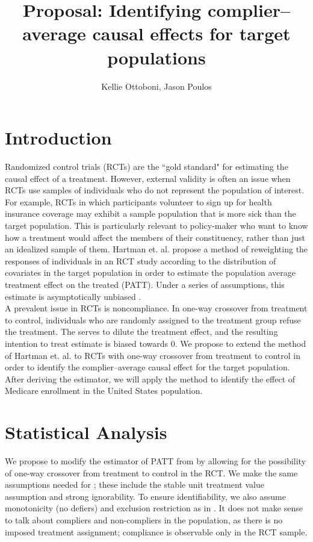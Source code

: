 \documentclass{article}
\title{Proposal: Identifying complier--average causal effects for target populations}
\author{Kellie Ottoboni, Jason Poulos}
\begin{document}
\maketitle

\section{Introduction}
Randomized control trials (RCTs) are the ``gold standard" for estimating the causal effect of a treatment.  However, external validity is often an issue when RCTs use samples of individuals who do not represent the population of interest.  For example, RCTs in which participants volunteer to sign up for health insurance coverage may exhibit a sample population that is more sick than the target population.  This is particularly relevant to policy-maker who want to know how a treatment would affect the members of their constituency, rather than just an idealized sample of them.  Hartman et. al. propose a method of reweighting the responses of individuals in an RCT study according to the distribution of covariates in the target population in order to estimate the population average treatment effect on the treated (PATT).  Under a series of assumptions, this estimate is asymptotically unbiased \cite{Hartman}. \\

A prevalent issue in RCTs is noncompliance.  In one-way crossover from treatment to control, individuals who are randomly assigned to the treatment group refuse the treatment.  The serves to dilute the treatment effect, and the resulting intention to treat estimate is biased towards $0$.  We propose to extend the method of Hartman et. al. to RCTs with one-way crossover from treatment to control in order to identify the complier--average causal effect for the target population.  After deriving the estimator, we will apply the method to identify the effect of Medicare enrollment in the United States population.

\section{Statistical Analysis}
We propose to modify the estimator of PATT from \cite{Hartman} by allowing for the possibility of one-way crossover from treatment to control in the RCT.  We make the same assumptions needed for \cite{Hartman}; these include the stable unit treatment value assumption and strong ignorability.  To ensure identifiability, we also assume monotonicity (no defiers) and exclusion restriction as in \cite{Angrist1996}.  It does not make sense to talk about compliers and non-compliers in the population, as there is no imposed treatment assignment; compliance is observable only in the RCT sample.   \\
\end{document}
